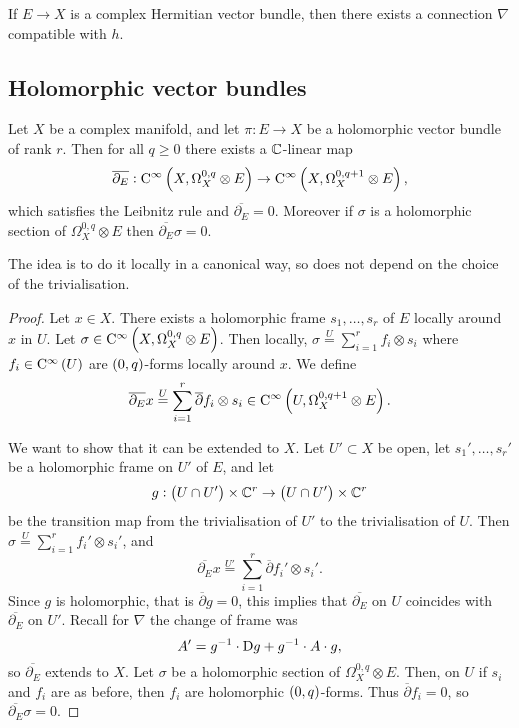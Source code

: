 \begin{theorem}
If $ E \to X $ is a complex Hermitian vector bundle, then there exists a connection $ \nabla $ compatible with $ h $.
\end{theorem}

\subsection{Holomorphic vector bundles}


\begin{proposition}
\label{prop:5.9}
Let $ X $ be a complex manifold, and let $ \pi : E \to X $ be a holomorphic vector bundle of rank $ r $. Then for all $ q \ge 0 $ there exists a $ \mathbb{C} $-linear map
$$ \overline{\partial_E} : \C^\infty\br{X, \Omega_X^{0, q} \otimes E} \to \C^\infty\br{X, \Omega_X^{0, q + 1} \otimes E}, $$
which satisfies the Leibnitz rule and $ \overline{\partial_E} = 0 $. Moreover if $ \sigma $ is a holomorphic section of $ \Omega_X^{0, q} \otimes E $ then $ \overline{\partial_E}\sigma = 0 $.
\end{proposition}

The idea is to do it locally in a canonical way, so does not depend on the choice of the trivialisation.

\begin{proof}
Let $ x \in X $. There exists a holomorphic frame $ s_1, \dots, s_r $ of $ E $ locally around $ x $ in $ U $. Let $ \sigma \in \C^\infty\br{X, \Omega_X^{0, q} \otimes E} $. Then locally, $ \sigma \overset{U}{=} \sum_{i = 1}^r f_i \otimes s_i $ where $ f_i \in \C^\infty\br{U} $ are $ \br{0, q} $-forms locally around $ x $. We define
$$ \overline{\partial_E}x \overset{U}{=} \sum_{i = 1}^r \overline{\partial}f_i \otimes s_i \in \C^\infty\br{U, \Omega_X^{0, q + 1} \otimes E}. $$

\pagebreak

We want to show that it can be extended to $ X $. Let $ U' \subset X $ be open, let $ s_1', \dots, s_r' $ be a holomorphic frame on $ U' $ of $ E $, and let
$$ g : \br{U \cap U'} \times \CC^r \to \br{U \cap U'} \times \CC^r $$
be the transition map from the trivialisation of $ U' $ to the trivialisation of $ U $. Then $ \sigma \overset{U}{=} \sum_{i = 1}^r f_i' \otimes s_i' $, and
$$ \overline{\partial_E}x \overset{U'}{=} \sum_{i = 1}^r \overline{\partial}f_i' \otimes s_i'. $$
Since $ g $ is holomorphic, that is $ \overline{\partial}g = 0 $, this implies that $ \overline{\partial_E} $ on $ U $ coincides with $ \overline{\partial_E} $ on $ U' $. Recall for $ \nabla $ the change of frame was
$$ A' = g^{-1} \cdot \mathrm{D} g + g^{-1} \cdot A \cdot g, $$
so $ \overline{\partial_E} $ extends to $ X $. Let $ \sigma $ be a holomorphic section of $ \Omega_X^{0, q} \otimes E $. Then, on $ U $ if $ s_i $ and $ f_i $ are as before, then $ f_i $ are holomorphic $ \br{0, q} $-forms. Thus $ \overline{\partial}f_i = 0 $, so $ \overline{\partial_E}\sigma = 0 $.
\end{proof}


